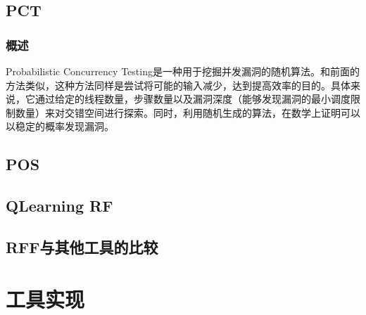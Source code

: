 \subsection{PCT}

\subsubsection{概述}

Probabilistic Concurrency Testing是一种用于挖掘并发漏洞的随机算法。和前面的方法类似，这种方法同样是尝试将可能的输入减少，达到提高效率的目的。具体来说，它通过给定的线程数量，步骤数量以及漏洞深度（能够发现漏洞的最小调度限制数量）来对交错空间进行探索。同时，利用随机生成的算法，在数学上证明可以以稳定的概率发现漏洞。

\subsection{POS}
\subsection{QLearning RF}
\subsection{RFF与其他工具的比较}

\section{工具实现}
